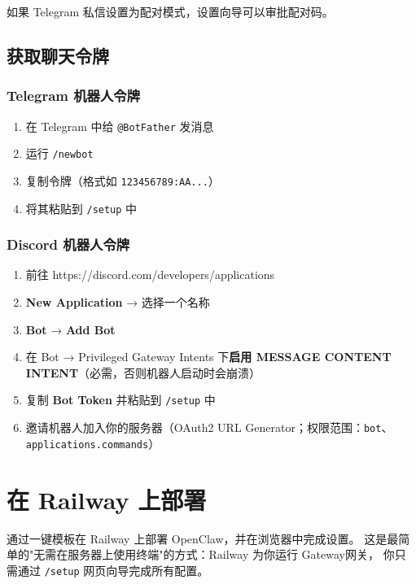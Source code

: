 如果 Telegram 私信设置为配对模式，设置向导可以审批配对码。

\subsection{获取聊天令牌}


\subsubsection{Telegram 机器人令牌}


\begin{enumerate}
  \item 在 Telegram 中给 \texttt{@BotFather} 发消息
  \item 运行 \texttt{/newbot}
  \item 复制令牌（格式如 \texttt{123456789:AA...}）
  \item 将其粘贴到 \texttt{/setup} 中
\end{enumerate}


\subsubsection{Discord 机器人令牌}


\begin{enumerate}
  \item 前往 https://discord.com/developers/applications
  \item \textbf{New Application} → 选择一个名称
  \item \textbf{Bot} → \textbf{Add Bot}
  \item 在 Bot → Privileged Gateway Intents 下\textbf{启用 MESSAGE CONTENT INTENT}（必需，否则机器人启动时会崩溃）
  \item 复制 \textbf{Bot Token} 并粘贴到 \texttt{/setup} 中
  \item 邀请机器人加入你的服务器（OAuth2 URL Generator；权限范围：\texttt{bot}、\texttt{applications.commands}）
\end{enumerate}



\clearpage

\section{在 Railway 上部署}

通过一键模板在 Railway 上部署 OpenClaw，并在浏览器中完成设置。
这是最简单的"无需在服务器上使用终端"的方式：Railway 为你运行 Gateway网关，
你只需通过 \texttt{/setup} 网页向导完成所有配置。

